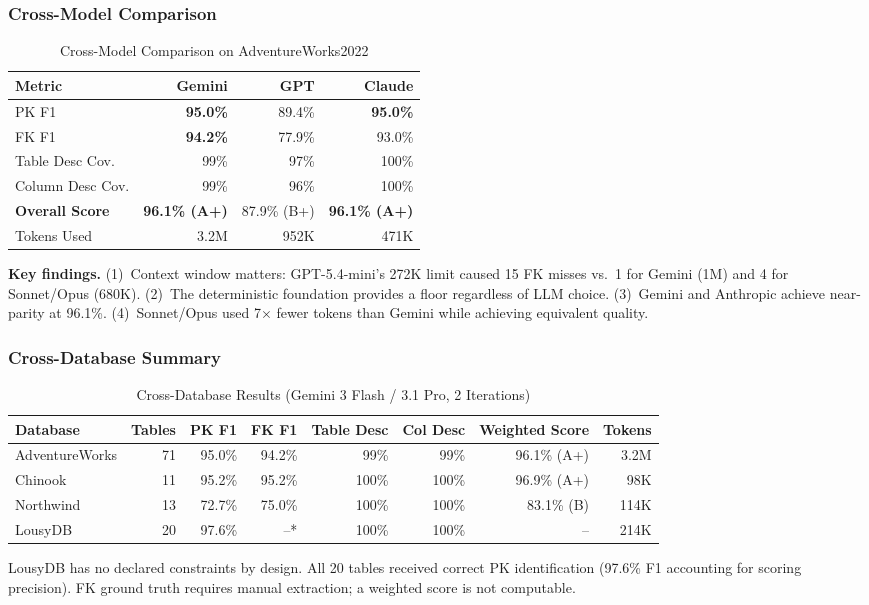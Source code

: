 \documentclass[twocolumn]{svjour3}
\begin{document}
\subsubsection{Cross-Model Comparison}

\begin{table}[htbp]
\caption{Cross-Model Comparison on AdventureWorks2022}
\label{tab:crossmodel}
\centering
\begin{tabular}{lrrr}
\toprule
\textbf{Metric} & \textbf{Gemini} & \textbf{GPT} & \textbf{Claude} \\
\midrule
PK F1 & \textbf{95.0\%} & 89.4\% & \textbf{95.0\%} \\
FK F1 & \textbf{94.2\%} & 77.9\% & 93.0\% \\
Table Desc Cov. & 99\% & 97\% & 100\% \\
Column Desc Cov. & 99\% & 96\% & 100\% \\
\textbf{Overall Score} & \textbf{96.1\% (A+)} & 87.9\% (B+) & \textbf{96.1\% (A+)} \\
Tokens Used & 3.2M & 952K & 471K \\
\bottomrule
\end{tabular}
\end{table}

\textbf{Key findings.} (1)~Context window matters: GPT-5.4-mini's 272K limit caused 15 FK misses vs.\ 1 for Gemini (1M) and 4 for Sonnet/Opus (680K). (2)~The deterministic foundation provides a floor regardless of LLM choice. (3)~Gemini and Anthropic achieve near-parity at 96.1\%. (4)~Sonnet/Opus used 7$\times$ fewer tokens than Gemini while achieving equivalent quality.

\subsubsection{Cross-Database Summary}

\begin{table}[htbp]
\caption{Cross-Database Results (Gemini 3 Flash / 3.1 Pro, 2 Iterations)}
\label{tab:crossdb}
\centering
\begin{tabular}{lrrrrrrr}
\toprule
\textbf{Database} & \textbf{Tables} & \textbf{PK F1} & \textbf{FK F1} & \textbf{Table Desc} & \textbf{Col Desc} & \textbf{Weighted Score} & \textbf{Tokens} \\
\midrule
AdventureWorks & 71 & 95.0\% & 94.2\% & 99\% & 99\% & 96.1\% (A+) & 3.2M \\
Chinook & 11 & 95.2\% & 95.2\% & 100\% & 100\% & 96.9\% (A+) & 98K \\
Northwind & 13 & 72.7\% & 75.0\% & 100\% & 100\% & 83.1\% (B) & 114K \\
LousyDB & 20 & 97.6\% & --* & 100\% & 100\% & -- & 214K \\
\bottomrule
\end{tabular}
\begin{flushleft}
\small *LousyDB has no declared constraints by design. All 20 tables received correct PK identification (97.6\% F1 accounting for scoring precision). FK ground truth requires manual extraction; a weighted score is not computable.
\end{flushleft}
\end{table}
\end{document}
